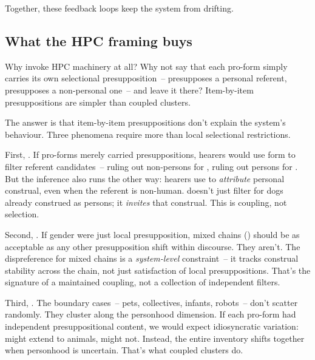 Together, these feedback loops keep the system from drifting.

\subsection{What the HPC framing buys}
\label{sec:12:hpc-payoff}

Why invoke HPC machinery at all? Why not say that each pro-form simply carries its own selectional presupposition~--  presupposes a personal referent,  presupposes a non-personal one~-- and leave it there? Item-by-item presuppositions are simpler than coupled clusters.

The answer is that item-by-item presuppositions don't explain the system's behaviour. Three phenomena require more than local selectional restrictions.

First, . If pro-forms merely carried presuppositions, hearers would use form to filter referent candidates~-- ruling out non-persons for , ruling out persons for . But the inference also runs the other way: hearers use  to \emph{attribute} personal construal, even when the referent is non-human.  doesn't just filter for dogs already construed as persons; it \emph{invites} that construal. This is coupling, not selection.

Second, . If gender were just local presupposition, mixed chains () should be as acceptable as any other presupposition shift within discourse. They aren't. The dispreference for mixed chains is a \emph{system-level} constraint~-- it tracks construal stability across the chain, not just satisfaction of local presuppositions. That's the signature of a maintained coupling, not a collection of independent filters.

Third, . The boundary cases~-- pets, collectives, infants, robots~-- don't scatter randomly. They cluster along the personhood dimension. If each pro-form had independent presuppositional content, we would expect idiosyncratic variation:  might extend to animals,  might not. Instead, the entire inventory shifts together when personhood is uncertain. That's what coupled clusters do.


